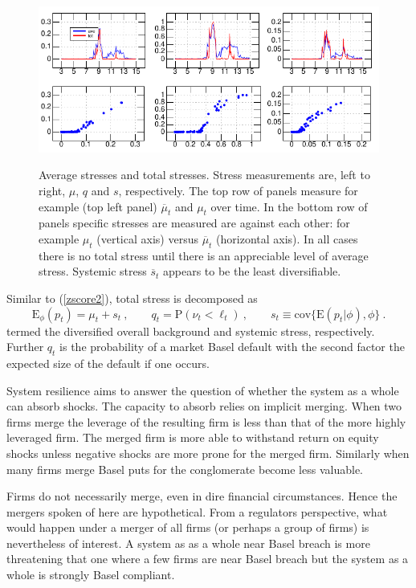 \documentclass[authoryear]{elsarticle}
\newcommand{\E}{\mathrm{E}}
\newcommand{\cov}{\mathrm{cov}}
\newcommand{\Es}{\E_\phi}
\newcommand{\eref}[1]{(\ref{#1})}
\newcommand{\cq}{\ , \qquad}
\renewcommand{\P}{\mathrm{P}}
\newcommand{\be}[1]{\begin{equation}\label{#1}}
\newcommand{\ee}{\end{equation}}
\begin{document}
\begin{figure}[htbp]
\begin{center}
\label{muqs}
\includegraphics{figures/muqs.pdf}
\caption{Average  stresses and  total stresses.   Stress measurements are, left to right, $\mu$, $q$ and $s$, respectively.   The top row of panels measure for example (top left panel)  $\overline \mu_t$ and $\mu_t$ over time.    In the bottom row of panels  specific stresses are measured are against each other:  for example $\mu_t$ (vertical axis) versus $\overline\mu_t$ (horizontal axis).  In all cases there is no total stress until there is an appreciable level of average stress.  Systemic stress $\overline s_t$ appears to be the least diversifiable.}
\end{center}
\end{figure}

Similar  to \eref{zscore2}, total  stress is decomposed as
\be{overall}
\Es(p_t) = \mu_t  + s_t\cq q_{t}=\P(\nu_t<\ell_t) \cq  s_t \equiv \cov\{\E(p_t|\phi),\phi\}\ .
\ee
termed the diversified overall background  and systemic stress, respectively.   Further $q_t$ is the probability of  a market Basel default with the second factor the expected size of the default if one occurs.

System resilience aims to answer the question of whether the system as a whole can absorb shocks.   The capacity to absorb relies on implicit merging.  When two firms merge the leverage of the resulting firm is less than that of the more highly leveraged firm.   The merged firm is more able to withstand return on equity shocks  unless negative shocks are more prone for the merged firm.   Similarly when many firms merge Basel puts for the conglomerate become less valuable.

Firms do not necessarily merge, even in dire financial circumstances.   Hence the mergers spoken of here are hypothetical.   From a regulators perspective, what would happen under a merger of all firms (or perhaps a group of firms) is nevertheless of interest.   A system as as a whole near Basel breach is more threatening that one where a few firms are near Basel breach but the system as a whole is strongly Basel compliant.
\end{document}

